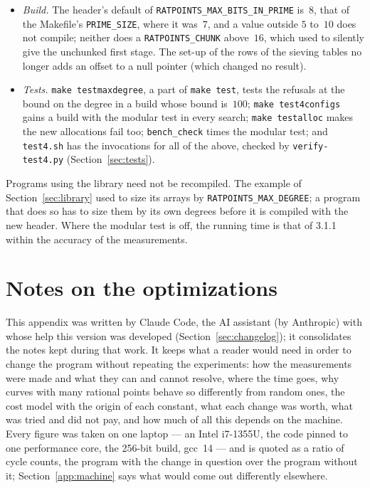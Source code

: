 \documentclass[12pt,a4paper,oneside]{amsart}
\begin{document}
\begin{itemize}
        format. The manual now says what a~\verb+%+ and a backslash before
        other characters print (Section~\ref{sec:usage}), that the weights
        a callback returns should not be negative
        (Section~\ref{sec:library}), and that several threads do not speed
        up a search for integral points (Section~\ref{sec:threads}).
  \item \emph{Build.} The header's default of
        \texttt{RATPOINTS\_MAX\_BITS\_IN\_PRIME} is~$8$, that of the
        Makefile's \texttt{PRIME\_SIZE}, where it was~$7$, and a value
        outside $5$ to~$10$ does not compile; neither does a
        \texttt{RATPOINTS\_CHUNK} above~$16$, which used to silently give
        the unchunked first stage. The set-up of the rows of
        the sieving tables no longer adds an offset to a null pointer
        (which changed no result).
  \item \emph{Tests.} \texttt{make testmaxdegree}, a part of \texttt{make
        test}, tests the refusals at the bound on the degree in a build
        whose bound is~$100$; \texttt{make test4configs} gains a build
        with the modular test in every search; \texttt{make testalloc}
        makes the new allocations fail too; \texttt{bench\_check} times
        the modular test; and \texttt{test4.sh} has the invocations for
        all of the above, checked by \texttt{verify-test4.py}
        (Section~\ref{sec:tests}).
\end{itemize}
Programs using the library need not be recompiled. The example of
Section~\ref{sec:library} used to size its arrays by
\texttt{RATPOINTS\_MAX\_DEGREE}; a program that does so has to size them
by its own degrees before it is compiled with the new header. Where the
modular test is off, the running time is that of 3.1.1 within the accuracy
of the measurements.


\appendix

\section{Notes on the optimizations}\label{app:notes}

This appendix was written by Claude Code, the AI assistant (by Anthropic)
with whose help this version was developed (Section~\ref{sec:changelog}); it
consolidates the notes kept during that work. It keeps what a reader would
need in order to change the program without repeating the experiments: how
the measurements were made and what they can and cannot resolve, where the
time goes, why curves with many rational points behave so differently from
random ones, the cost model with the origin of each constant, what each
change was worth, what was tried and did not pay, and how much of all this
depends on the machine. Every figure was taken on one laptop --- an Intel
i7-1355U, the code pinned to one performance core, the 256-bit build,
gcc~14 --- and is quoted as a ratio of cycle counts, the program with the
change in question over the program without it;
Section~\ref{app:machine} says what would come out differently elsewhere.
\end{document}
